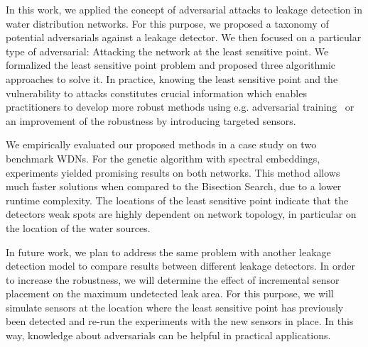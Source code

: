 In this work, we applied the concept of adversarial attacks to leakage
detection in water distribution networks. For this purpose, we proposed a
taxonomy of potential adversarials against a leakage detector. We then focused
on a particular type of adversarial: Attacking the network at the least
sensitive point. We formalized the least sensitive point
problem and proposed three algorithmic approaches to solve it.
In practice, knowing the least sensitive point and the vulnerability to attacks constitutes crucial information which enables practitioners to develop more robust methods using e.g. adversarial training~\cite{bai2021recent} or an improvement of the robustness by introducing targeted sensors.

We empirically evaluated our proposed methods in a case study on two benchmark WDNs.
For the genetic algorithm with spectral embeddings, experiments yielded
promising results on both networks. This method allows much faster solutions
when compared to the Bisection Search, due to a lower runtime complexity. The
locations of the least sensitive point indicate that the detectors weak spots
are highly dependent on network topology, in particular on the location of the
water sources.

In future work, we plan to address the same problem with another leakage
detection model to compare results between different leakage detectors.
In order to increase the robustness, we will determine the
effect of incremental sensor placement on the maximum undetected leak area.
For this purpose, we will simulate sensors at the location where the least
sensitive point has previously been detected and re-run the experiments with
the new sensors in place. In this way, knowledge about adversarials can be 
helpful in practical applications.
